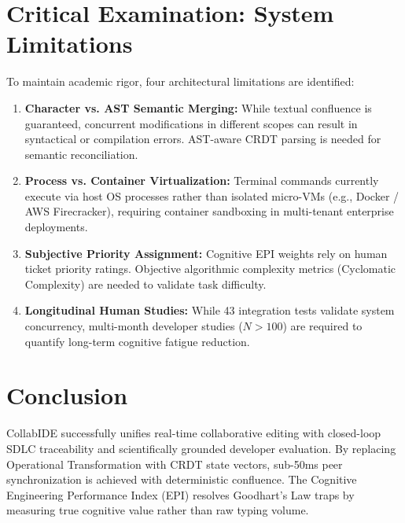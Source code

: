 \documentclass[conference]{IEEEtran}
\begin{document}
\section{Critical Examination: System Limitations}
To maintain academic rigor, four architectural limitations are identified:
\begin{enumerate}
    \item \textbf{Character vs. AST Semantic Merging:} While textual confluence is guaranteed, concurrent modifications in different scopes can result in syntactical or compilation errors. AST-aware CRDT parsing is needed for semantic reconciliation.
    \item \textbf{Process vs. Container Virtualization:} Terminal commands currently execute via host OS processes rather than isolated micro-VMs (e.g., Docker / AWS Firecracker), requiring container sandboxing in multi-tenant enterprise deployments.
    \item \textbf{Subjective Priority Assignment:} Cognitive EPI weights rely on human ticket priority ratings. Objective algorithmic complexity metrics (Cyclomatic Complexity) are needed to validate task difficulty.
    \item \textbf{Longitudinal Human Studies:} While 43 integration tests validate system concurrency, multi-month developer studies ($N > 100$) are required to quantify long-term cognitive fatigue reduction.
\end{enumerate}

\section{Conclusion}
CollabIDE successfully unifies real-time collaborative editing with closed-loop SDLC traceability and scientifically grounded developer evaluation. By replacing Operational Transformation with CRDT state vectors, sub-50ms peer synchronization is achieved with deterministic confluence. The Cognitive Engineering Performance Index (EPI) resolves Goodhart's Law traps by measuring true cognitive value rather than raw typing volume.
\end{document}
